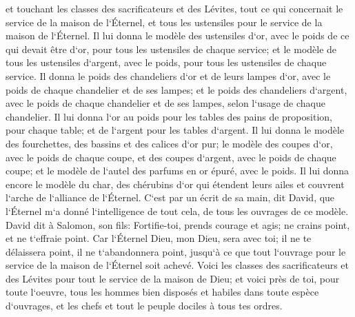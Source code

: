 \verse et touchant les classes des sacrificateurs et des Lévites, tout ce qui concernait le service de la maison de l`Éternel, et tous les ustensiles pour le service de la maison de l`Éternel. 
\verse Il lui donna le modèle des ustensiles d`or, avec le poids de ce qui devait être d`or, pour tous les ustensiles de chaque service; et le modèle de tous les ustensiles d`argent, avec le poids, pour tous les ustensiles de chaque service. 
\verse Il donna le poids des chandeliers d`or et de leurs lampes d`or, avec le poids de chaque chandelier et de ses lampes; et le poids des chandeliers d`argent, avec le poids de chaque chandelier et de ses lampes, selon l`usage de chaque chandelier. 
\verse Il lui donna l`or au poids pour les tables des pains de proposition, pour chaque table; et de l`argent pour les tables d`argent. 
\verse Il lui donna le modèle des fourchettes, des bassins et des calices d`or pur; le modèle des coupes d`or, avec le poids de chaque coupe, et des coupes d`argent, avec le poids de chaque coupe; 
\verse et le modèle de l`autel des parfums en or épuré, avec le poids. Il lui donna encore le modèle du char, des chérubins d`or qui étendent leurs ailes et couvrent l`arche de l`alliance de l`Éternel. 
\verse C`est par un écrit de sa main, dit David, que l`Éternel m`a donné l`intelligence de tout cela, de tous les ouvrages de ce modèle. 
\verse David dit à Salomon, son fils: Fortifie-toi, prends courage et agis; ne crains point, et ne t`effraie point. Car l`Éternel Dieu, mon Dieu, sera avec toi; il ne te délaissera point, il ne t`abandonnera point, jusqu`à ce que tout l`ouvrage pour le service de la maison de l`Éternel soit achevé. 
\verse Voici les classes des sacrificateurs et des Lévites pour tout le service de la maison de Dieu; et voici près de toi, pour toute l`oeuvre, tous les hommes bien disposés et habiles dans toute espèce d`ouvrages, et les chefs et tout le peuple dociles à tous tes ordres. 

\chapter{}


